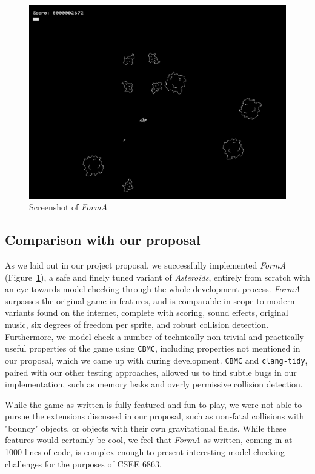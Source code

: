 \documentclass{article}
\newcommand{\Name}{\textit{FormA}\xspace}
\newcommand{\cbmc}{\texttt{CBMC}}
\begin{document}
        \begin{figure}[h!]
            \includegraphics[width=\linewidth]{gameplay.png}
            \caption{Screenshot of \Name{}}
            \label{fig:gameplay}
        \end{figure}

    \subsection{Comparison with our proposal}

        As we laid out in our project proposal, we successfully implemented
        \Name{} (Figure~\ref{fig:gameplay}), a safe and finely tuned variant of
        \textit{Asteroids}, entirely from scratch with an eye towards model
        checking through the whole development process. \Name{} surpasses the
        original game in features, and is comparable in scope to modern variants
        found on the internet, complete with scoring, sound effects, original
        music, six degrees of freedom per sprite, and robust collision detection.
        Furthermore, we model-check a number of technically non-trivial and
        practically useful properties of the game using \cbmc{}, including
        properties not mentioned in our proposal, which we came up with during
        development. \cbmc{} and \texttt{clang-tidy}, paired with our other
        testing approaches, allowed us to find subtle bugs in our
        implementation, such as memory leaks and overly permissive collision
        detection.

        While the game as written is fully featured and fun to play, we were not
        able to pursue the extensions discussed in our proposal, such as
        non-fatal collisions with "bouncy" objects, or objects with their own
        gravitational fields. While these features would certainly be cool, we
        feel that \Name{} as written, coming in at 1000 lines of code, is
        complex enough to present interesting model-checking challenges for
        the purposes of CSEE 6863.
\end{document}
